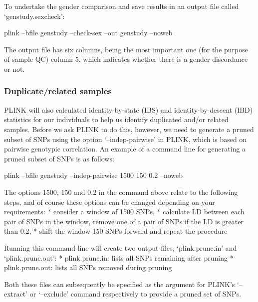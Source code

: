 \documentclass[]{book}
\newenvironment{Shaded}{\begin{snugshade}}{\end{snugshade}}
\newcommand{\ExtensionTok}[1]{#1}
\newcommand{\NormalTok}[1]{#1}
\begin{document}
To undertake the gender comparison and save results in an output file
called `genstudy.sexcheck':

\begin{Shaded}
\begin{Highlighting}[]
\ExtensionTok{plink}\NormalTok{ --bfile genstudy --check-sex --out genstudy --noweb}
\end{Highlighting}
\end{Shaded}

The output file has six columns, being the most important one (for the
purpose of sample QC) column 5, which indicates whether there is a
gender discordance or not.

\subsubsection{Duplicate/related
samples}\label{duplicaterelated-samples}

PLINK will also calculated identity-by-state (IBS) and
identity-by-descent (IBD) statistics for our individuals to help us
identify duplicated and/or related samples. Before we ask PLINK to do
this, however, we need to generate a pruned subset of SNPs using the
option `--indep-pairwise' in PLINK, which is based on pairwise genotypic
correlation. An example of a command line for generating a pruned subset
of SNPs is as follows:

\begin{Shaded}
\begin{Highlighting}[]
\ExtensionTok{plink}\NormalTok{ --bfile genstudy --indep-pairwise 1500 150 0.2 --noweb}
\end{Highlighting}
\end{Shaded}

The options 1500, 150 and 0.2 in the command above relate to the
following steps, and of course these options can be changed depending on
your requirements: * consider a window of 1500 SNPs, * calculate LD
between each pair of SNPs in the window, remove one of a pair of SNPs if
the LD is greater than 0.2, * shift the window 150 SNPs forward and
repeat the procedure

Running this command line will create two output files, `plink.prune.in'
and `plink.prune.out': * plink.prune.in: lists all SNPs remaining after
pruning * plink.prune.out: lists all SNPs removed during pruning

Both these files can subsequently be specified as the argument for
PLINK's `--extract' or `--exclude' command respectively to provide a
pruned set of SNPs.
\end{document}

